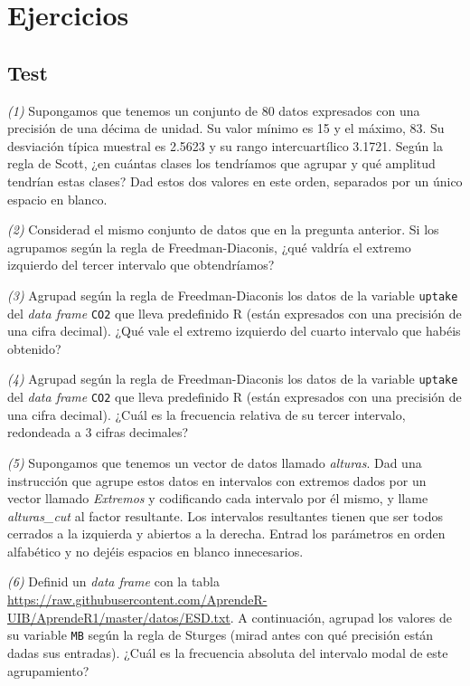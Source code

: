 \documentclass[]{book}
\theoremstyle{definition}
\theoremstyle{definition}
\theoremstyle{definition}
\theoremstyle{remark}
\begin{document}
\hypertarget{ejercicios-11}{%
\section{Ejercicios}\label{ejercicios-11}}

\hypertarget{test-10}{%
\subsection*{Test}\label{test-10}}

\emph{(1)} Supongamos que tenemos un conjunto de 80 datos expresados con una precisión de una décima de unidad. Su valor mínimo es 15 y el máximo, 83. Su desviación típica muestral es 2.5623 y su rango intercuartílico 3.1721. Según la regla de Scott, ¿en cuántas clases los tendríamos que agrupar y qué amplitud tendrían estas clases? Dad estos dos valores en este orden, separados por un único espacio en blanco.

\emph{(2)} Considerad el mismo conjunto de datos que en la pregunta anterior. Si los agrupamos según la regla de Freedman-Diaconis, ¿qué valdría el extremo izquierdo del tercer intervalo que obtendríamos?

\emph{(3)} Agrupad según la regla de Freedman-Diaconis los datos de la variable \texttt{uptake} del \emph{data frame} \texttt{CO2} que lleva predefinido R (están expresados con una precisión de una cifra decimal). ¿Qué vale el extremo izquierdo del cuarto intervalo que habéis obtenido?

\emph{(4)} Agrupad según la regla de Freedman-Diaconis los datos de la variable \texttt{uptake} del \emph{data frame} \texttt{CO2} que lleva predefinido R (están expresados con una precisión de una cifra decimal). ¿Cuál es la frecuencia relativa de su tercer intervalo, redondeada a 3 cifras decimales?

\emph{(5)} Supongamos que tenemos un vector de datos llamado \emph{alturas}. Dad una instrucción que agrupe estos datos en intervalos con extremos dados por un vector llamado \emph{Extremos} y codificando cada intervalo por él mismo, y llame \emph{alturas\_cut} al factor resultante. Los intervalos resultantes tienen que ser todos cerrados a la izquierda y abiertos a la derecha. Entrad los parámetros en orden alfabético y no dejéis espacios en blanco innecesarios.

\emph{(6)} Definid un \emph{data frame} con la tabla \url{https://raw.githubusercontent.com/AprendeR-UIB/AprendeR1/master/datos/ESD.txt}. A continuación, agrupad los valores de su variable \texttt{MB} según la regla de Sturges (mirad antes con qué precisión están dadas sus entradas). ¿Cuál es la frecuencia absoluta del intervalo modal de este agrupamiento?
\end{document}
